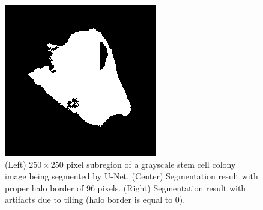 \documentclass[10pt, indentfirst]{article}
\begin{document}
\begin{figure}
\begin{minipage}{0.32\columnwidth}
	\end{minipage}
	\begin{minipage}{0.32\columnwidth}
		\includegraphics[width=\columnwidth]{figs/no_halo.png}
	\end{minipage}
	\caption{(Left) $250 \times 250$ pixel subregion of a grayscale stem cell colony image being segmented by U-Net. (Center) Segmentation result with proper halo border of 96 pixels. (Right) Segmentation result with artifacts due to tiling (halo border is equal to $0$).} 
	\label{fig:nohalo}
\end{figure}

\end{document}
